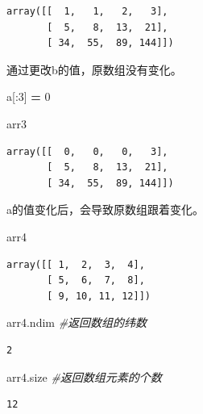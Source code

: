\documentclass[]{article}
\newenvironment{Shaded}{\begin{snugshade}}{\end{snugshade}}
\newcommand{\DecValTok}[1]{\textcolor[rgb]{0.00,0.00,0.81}{#1}}
\newcommand{\CommentTok}[1]{\textcolor[rgb]{0.56,0.35,0.01}{\textit{#1}}}
\newcommand{\OperatorTok}[1]{\textcolor[rgb]{0.81,0.36,0.00}{\textbf{#1}}}
\newcommand{\NormalTok}[1]{#1}
\begin{document}
\begin{verbatim}
array([[  1,   1,   2,   3],
       [  5,   8,  13,  21],
       [ 34,  55,  89, 144]])
\end{verbatim}

通过更改b的值，原数组没有变化。

\begin{Shaded}
\begin{Highlighting}[]
\NormalTok{a[:}\DecValTok{3}\NormalTok{] }\OperatorTok{=} \DecValTok{0}
\end{Highlighting}
\end{Shaded}

\begin{Shaded}
\begin{Highlighting}[]
\NormalTok{arr3}
\end{Highlighting}
\end{Shaded}

\begin{verbatim}
array([[  0,   0,   0,   3],
       [  5,   8,  13,  21],
       [ 34,  55,  89, 144]])
\end{verbatim}

a的值变化后，会导致原数组跟着变化。

\begin{Shaded}
\begin{Highlighting}[]
\NormalTok{arr4}
\end{Highlighting}
\end{Shaded}

\begin{verbatim}
array([[ 1,  2,  3,  4],
       [ 5,  6,  7,  8],
       [ 9, 10, 11, 12]])
\end{verbatim}

\begin{Shaded}
\begin{Highlighting}[]
\NormalTok{arr4.ndim }\CommentTok{#返回数组的纬数}
\end{Highlighting}
\end{Shaded}

\begin{verbatim}
2
\end{verbatim}

\begin{Shaded}
\begin{Highlighting}[]
\NormalTok{arr4.size }\CommentTok{#返回数组元素的个数}
\end{Highlighting}
\end{Shaded}

\begin{verbatim}
12
\end{verbatim}
\end{document}
